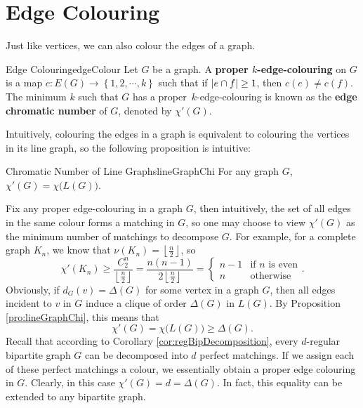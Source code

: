 \documentclass[math]{amznotes}
\theoremstyle{remark}
\newcommand{\0}{\mathbf{0}}
\newcommand{\1}{\mathbf{1}}
\begin{document}
\section{Edge Colouring}
Just like vertices, we can also colour the edges of a graph. 
\begin{dfnbox}{Edge Colouring}{edgeColour}
    Let $G$ be a graph. A {\color{red} \textbf{proper $k$-edge-colouring}} on $G$ is a map $c \colon E(G) \to \left\{1, 2, \cdots, k\right\}$ such that if ${\left\lvert {e \cap f} \right\rvert} \geq 1$, then $c(e) \neq c(f)$. The minimum $k$ such that $G$ has a proper~$k$-edge-colouring is known as the {\color{red} \textbf{edge chromatic number}} of $G$, denoted by $\chi'(G)$.
\end{dfnbox}
Intuitively, colouring the edges in a graph is equivalent to colouring the vertices in its line graph, so the following proposition is intuitive:
\begin{probox}{Chromatic Number of Line Graphs}{lineGraphChi}
    For any graph $G$, $\chi'(G) = \chi\bigl(L(G)\bigr)$.
\end{probox}
Fix any proper edge-colouring in a graph $G$, then intuitively, the set of all edges in the same colour forms a matching in $G$, so one may choose to view $\chi'(G)$ as the minimum number of matchings to decompose $G$. For example, for a complete graph $K_n$, we know that $\nu(K_n) = \left\lfloor\frac{n}{2}\right\rfloor$, so 
\begin{equation*}
    \chi'(K_n) \geq \frac{C^n_2}{\left\lfloor\frac{n}{2}\right\rfloor} = \frac{n(n - 1)}{2\left\lfloor\frac{n}{2}\right\rfloor} = \begin{cases}
        n - 1 & \textrm{if } n \textrm{ is even} \\
        n & \textrm{otherwise}
    \end{cases}.
\end{equation*}
Obviously, if $d_G(v) = \Delta(G)$ for some vertex in a graph $G$, then all edges incident to $v$ in $G$ induce a clique of order $\Delta(G)$ in $L(G)$. By Proposition \ref{pro:lineGraphChi}, this means that 
\begin{equation*}
    \chi'(G) = \chi\bigl(L(G)\bigr) \geq \Delta(G).
\end{equation*}
Recall that according to Corollary \ref{cor:regBipDecomposition}, every $d$-regular bipartite graph $G$ can be decomposed into $d$ perfect matchings. If we assign each of these perfect matchings a colour, we essentially obtain a proper edge colouring in $G$. Clearly, in this case $\chi'(G) = d = \Delta(G)$. In fact, this equality can be extended to any bipartite graph.
\end{document}
